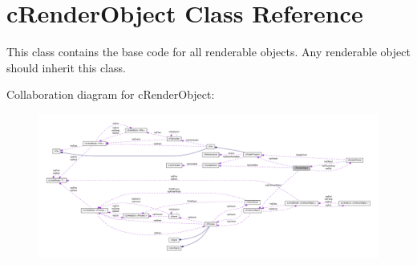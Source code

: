 \hypertarget{classc_render_object}{
\section{cRenderObject Class Reference}
\label{classc_render_object}
}


This class contains the base code for all renderable objects. Any renderable object should inherit this class.  




Collaboration diagram for cRenderObject:\nopagebreak
\begin{figure}[H]
\begin{center}
\leavevmode
\includegraphics[width=400pt]{classc_render_object__coll__graph}
\end{center}
\end{figure}
